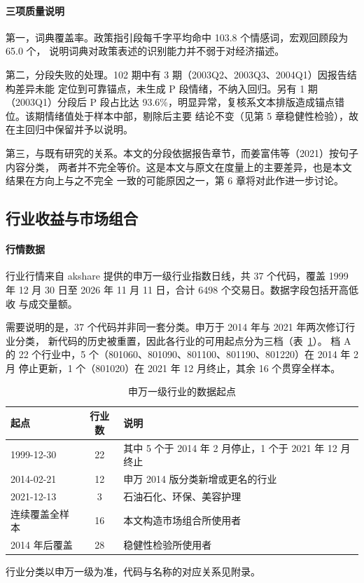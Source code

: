 \paragraph{三项质量说明}
第一，词典覆盖率。政策指引段每千字平均命中 103.8 个情感词，宏观回顾段为 65.0 个，
说明词典对政策表述的识别能力并不弱于对经济描述。

第二，分段失败的处理。102 期中有 3 期（2003Q2、2003Q3、2004Q1）因报告结构差异未能
定位到可靠锚点，未生成 P 段情绪，不纳入回归。另有 1 期（2003Q1）分段后 P 段占比达
93.6\%，明显异常，复核系文本排版造成锚点错位。该期情绪值处于样本中部，剔除后主要
结论不变（见第 5 章稳健性检验），故在主回归中保留并予以说明。

第三，与既有研究的关系。本文的分段依据报告章节，而姜富伟等（2021）按句子内容分类，
两者并不完全等价。这是本文与原文在度量上的主要差异，也是本文结果在方向上与之不完全
一致的可能原因之一，第 6 章将对此作进一步讨论。

\subsection{行业收益与市场组合}

\paragraph{行情数据}
行业行情来自 akshare 提供的申万一级行业指数日线，共 37 个代码，覆盖
1999 年 12 月 30 日至 2026 年 11 月 11 日，合计 6498 个交易日。数据字段包括开高低收
与成交量额。

需要说明的是，37 个代码并非同一套分类。申万于 2014 年与 2021 年两次修订行业分类，
新代码的历史被重置，因此各行业的可用起点分为三档（表~\ref{tab:industry}）。
档 A 的 22 个行业中，5 个（801060、801090、801100、801190、801220）在 2014 年 2 月
停止更新，1 个（801020）在 2021 年 12 月终止，其余 16 个贯穿全样本。

\begin{table}[htbp]
\centering
\small
\begin{threeparttable}
\caption{申万一级行业的数据起点}
\label{tab:industry}
\begin{tabular}{lcl}
\toprule
起点 & 行业数 & 说明 \\
\midrule
1999-12-30 & 22 & 其中 5 个于 2014 年 2 月停止，1 个于 2021 年 12 月终止 \\
2014-02-21 & 12 & 申万 2014 版分类新增或更名的行业 \\
2021-12-13 & 3  & 石油石化、环保、美容护理 \\
\midrule
连续覆盖全样本 & 16 & 本文构造市场组合所使用者 \\
2014 年后覆盖 & 28 & 稳健性检验所使用者 \\
\bottomrule
\end{tabular}
\begin{tablenotes}[flushleft]
\footnotesize
\item 行业分类以申万一级为准，代码与名称的对应关系见附录。
\end{tablenotes}
\end{threeparttable}
\end{table}

